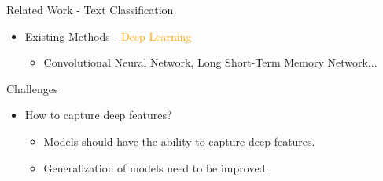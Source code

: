 \documentclass[
 size=14pt,
 paper=smartboard,  %
 mode=present, 		%
 display=slides, 	%
 style=tuliplab,  	%
 pauseslide,
 fleqn,leqno]{powerdot}
\begin{document}
\begin{slide}[toc=,bm=]{Related Work - Text Classification}
	
	\begin{itemize}
		\item
		Existing Methods - \textcolor{orange} {Deep Learning}
		
		\begin{itemize}
			\item
			Convolutional Neural Network, Long Short-Term Memory Network...
			
		\end{itemize}
		\bigskip
	\end{itemize}
	
\end{slide}


\begin{slide}{Challenges}
\begin{itemize}
\item
How to capture deep features?

\begin{itemize}
\item
Models should have the ability to capture deep features.

\item
Generalization of models need to be improved.
\end{itemize}
\end{itemize}


\end{slide}
\end{document}
